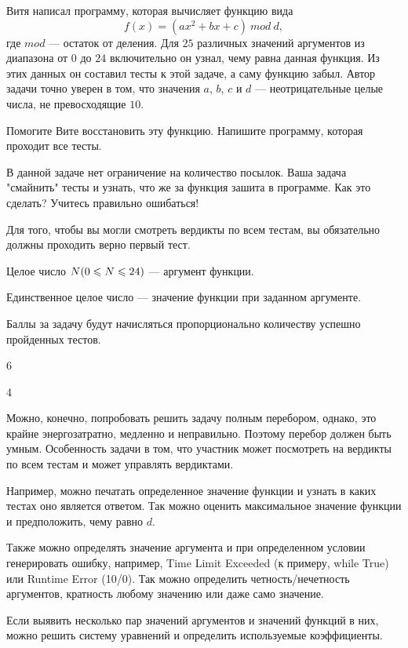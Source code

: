 
Витя написал программу, которая вычисляет функцию вида $$f(x)=(ax^2+bx+c)\: mod \: d,$$ где $mod$ — остаток от деления. 
Для $25$ различных значений аргументов из диапазона от $0$ до $24$ включительно он узнал, чему равна данная функция. Из этих 
данных он составил тесты к этой задаче, а саму функцию забыл. Автор задачи точно уверен в том, что значения $a$, $b$, $c$ и $d$ — 
неотрицательные целые числа, не превосходящие $10$.

Помогите Вите восстановить эту функцию. Напишите программу, которая проходит все тесты.

В данной задаче нет ограничение на количество посылок. Ваша задача "смайнить" тесты и узнать, что же за функция зашита в программе. 
Как это сделать? Учитесь правильно ошибаться! 

Для того, чтобы вы могли смотреть вердикты по всем тестам, вы обязательно должны проходить верно первый тест.


Целое число $N\space(0\leq N\leq24)$  — аргумент функции.

\outputfmtSection

Единственное целое число — значение функции при заданном аргументе.

\markSection

Баллы за задачу будут начисляться пропорционально количеству успешно пройденных тестов.


\begin{myverbbox}[\small]{\vinput}
    6
\end{myverbbox}

\begin{myverbbox}[\small]{\voutput}
    4
\end{myverbbox}

\solutionSection

Можно, конечно, попробовать решить задачу полным перебором, однако, это крайне энергозатратно, медленно и неправильно. Поэтому перебор должен быть умным. Особенность задачи в том, что участник может посмотреть на вердикты по всем тестам и может управлять вердиктами. 

Например, можно печатать определенное значение функции и узнать в каких тестах оно является ответом. Так можно оценить максимальное значение функции и предположить, чему равно $d$.  

Также можно определять значение аргумента и при определенном условии генерировать ошибку, например, Time Limit Exceeded (к примеру, while True) или Runtime Error (10/0). Так можно определить четность/нечетность аргументов, кратность любому значению или даже само значение.

Если выявить несколько пар значений аргументов и значений функций в них, можно решить систему уравнений и определить используемые коэффициенты.

